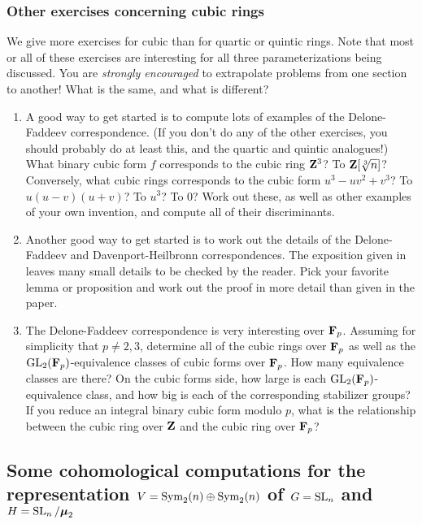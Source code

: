 \subsubsection{Other exercises concerning cubic rings}

We give more exercises for cubic than for quartic or quintic rings. Note that 
most or all of these exercises are interesting for all three parameterizations 
being discussed. You are \emph{strongly encouraged} to extrapolate problems 
from one section to another! What is the same, and what is different? 
\begin{enumerate}[\indent a)]
  \item A good way to get started is to compute lots of examples of the 
    Delone-Faddeev correspondence. (If you don't do any of the other 
    exercises, you should probably do at least this, and the quartic and 
    quintic analogues!) What binary cubic form $f$ corresponds to the cubic 
    ring $\mathbf{Z}^3$? To $\mathbf{Z}[\sqrt[3] n]$? Conversely, what cubic rings 
    corresponds to the cubic form $u^3-u v^2+v^3$? To $u(u-v)(u+v)$? To $u^3$? 
    To $0$? Work out these, as well as other examples of your own invention, 
    and compute all of their discriminants. 
  \item Another good way to get started is to work out the details of the 
    Delone-Faddeev and Davenport-Heilbronn correspondences. The exposition 
    given in \cite[\S 2]{bst13} leaves many small details to be checked by the 
    reader. Pick your favorite lemma or proposition and work out the proof in 
    more detail than given in the paper. 
  \item The Delone-Faddeev correspondence is very interesting over $\mathbf{F}_p$. 
    Assuming for simplicity that $p\ne 2,3$, determine all of the cubic rings 
    over $\mathbf{F}_p$ as well as the $\operatorname{GL}_2(\mathbf{F}_p)$-equivalence classes 
    of cubic forms over $\mathbf{F}_p$. How many equivalence classes are there? On the 
    cubic forms side, how large is each $\operatorname{GL}_2(\mathbf{F}_p)$-equivalence 
    class, and how big is each of the corresponding stabilizer groups? If you 
    reduce an integral binary cubic form modulo $p$, what is the relationship 
    between the cubic ring over $\mathbf{Z}$ and the cubic ring over $\mathbf{F}_p$?
\end{enumerate}





\subsection{Some cohomological computations for the representation \texorpdfstring{$V=\operatorname{Sym}_2(n)\oplus \operatorname{Sym}_2(n)$}{V=Sym2(n)+Sym2(n)} of \texorpdfstring{$G=\operatorname{SL}_n$}{G=SLn} and \texorpdfstring{$H=\operatorname{SL}_n/\boldsymbol\mu_2$}{H=SL2/mu2}}

